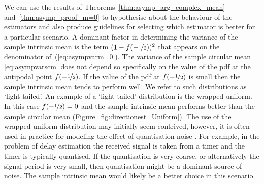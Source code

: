 \documentclass[journal]{../bib/IEEEtran}
\begin{document}
We can use the results of Theorems~\ref{thm:asymp_arg_complex_mean} and~\ref{thm:asymp_proof_m=0} to hypothesise about the behaviour of the estimators and also produce guidelines for selecting which estimator is better for a particular scenario.  A dominant factor in determining the variance of the sample intrinsic mean is the term $(1 - f(-\nicefrac{1}{2}))^2$ that appears on the denominator of~(\ref{eq:asympvarm=0}).  The variance of the sample circular mean \eqref{eq:asympvarscm} does not depend so specifically on the value of the pdf at the antipodal point $f(-\nicefrac{1}{2})$. If the value of the pdf at $f(-\nicefrac{1}{2})$ is small then the sample intrinsic mean tends to perform well. We refer to such distributions as `light-tailed'. An example of a `light-tailed' distribution is the wrapped uniform. In this case $f(-\nicefrac{1}{2}) = 0$ and the sample intrinsic mean performs better than the sample circular mean (Figure~\ref{fig:directionest_Uniform}). The use of the wrapped uniform distribution may initially seem contrived, however, it is often used in practice for modeling the effect of quantisation noise \cite{Widrow-Kollar_quant_noise_2008}.  For example, in the problem of delay estimation \cite{Elton_circstat_radar_pulse_1994} the received signal is taken from a timer and the timer is typically quantised.  If the quantisation is very coarse, or alternatively the signal period is very small, then quantisation might be a dominant source of noise.  The sample intrinsic mean would likely be a better choice in this scenario. 
\end{document}
